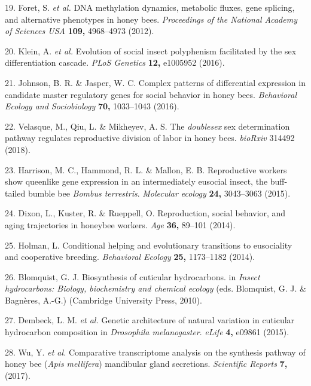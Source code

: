\documentclass[12pt,]{article}
\begin{document}
\hypertarget{ref-Foret2012jf}{}
19. Foret, S. \emph{et al.} DNA methylation dynamics, metabolic fluxes,
gene splicing, and alternative phenotypes in honey bees.
\emph{Proceedings of the National Academy of Sciences USA} \textbf{109,}
4968--4973 (2012).

\hypertarget{ref-Klein:2016da}{}
20. Klein, A. \emph{et al.} Evolution of social insect polyphenism
facilitated by the sex differentiation cascade. \emph{PLoS Genetics}
\textbf{12,} e1005952 (2016).

\hypertarget{ref-Johnson:2016ko}{}
21. Johnson, B. R. \& Jasper, W. C. Complex patterns of differential
expression in candidate master regulatory genes for social behavior in
honey bees. \emph{Behavioral Ecology and Sociobiology} \textbf{70,}
1033--1043 (2016).

\hypertarget{ref-velasque2018doublesex}{}
22. Velasque, M., Qiu, L. \& Mikheyev, A. S. The \emph{doublesex} sex
determination pathway regulates reproductive division of labor in honey
bees. \emph{bioRxiv} 314492 (2018).

\hypertarget{ref-Harrison:2015kf}{}
23. Harrison, M. C., Hammond, R. L. \& Mallon, E. B. Reproductive
workers show queenlike gene expression in an intermediately eusocial
insect, the buff-tailed bumble bee \emph{Bombus terrestris}.
\emph{Molecular ecology} \textbf{24,} 3043--3063 (2015).

\hypertarget{ref-Dixon:2014it}{}
24. Dixon, L., Kuster, R. \& Rueppell, O. Reproduction, social behavior,
and aging trajectories in honeybee workers. \emph{Age} \textbf{36,}
89--101 (2014).

\hypertarget{ref-holman2014co}{}
25. Holman, L. Conditional helping and evolutionary transitions to
eusociality and cooperative breeding. \emph{Behavioral Ecology}
\textbf{25,} 1173--1182 (2014).

\hypertarget{ref-Blomquist:2010ux}{}
26. Blomquist, G. J. Biosynthesis of cuticular hydrocarbons. in
\emph{Insect hydrocarbons: Biology, biochemistry and chemical ecology}
(eds. Blomquist, G. J. \& Bagnères, A.-G.) (Cambridge University Press,
2010).

\hypertarget{ref-Dembeck:2015jb}{}
27. Dembeck, L. M. \emph{et al.} Genetic architecture of natural
variation in cuticular hydrocarbon composition in \emph{Drosophila
melanogaster}. \emph{eLife} \textbf{4,} e09861 (2015).

\hypertarget{ref-Wu:2017br}{}
28. Wu, Y. \emph{et al.} Comparative transcriptome analysis on the
synthesis pathway of honey bee (\emph{Apis mellifera}) mandibular gland
secretions. \emph{Scientific Reports} \textbf{7,} (2017).
\end{document}

